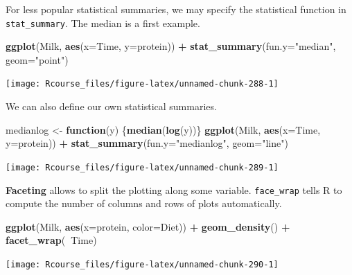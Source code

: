 \documentclass[]{book}
\newenvironment{Shaded}{\begin{snugshade}}{\end{snugshade}}
\newcommand{\ControlFlowTok}[1]{\textcolor[rgb]{0.13,0.29,0.53}{\textbf{#1}}}
\newcommand{\DataTypeTok}[1]{\textcolor[rgb]{0.13,0.29,0.53}{#1}}
\newcommand{\KeywordTok}[1]{\textcolor[rgb]{0.13,0.29,0.53}{\textbf{#1}}}
\newcommand{\NormalTok}[1]{#1}
\newcommand{\OperatorTok}[1]{\textcolor[rgb]{0.81,0.36,0.00}{\textbf{#1}}}
\newcommand{\StringTok}[1]{\textcolor[rgb]{0.31,0.60,0.02}{#1}}
\theoremstyle{definition}
\theoremstyle{definition}
\theoremstyle{definition}
\theoremstyle{remark}
\begin{document}
For less popular statistical summaries, we may specify the statistical function in \texttt{stat\_summary}. The median is a first example.

\begin{Shaded}
\begin{Highlighting}[]
\KeywordTok{ggplot}\NormalTok{(Milk, }\KeywordTok{aes}\NormalTok{(}\DataTypeTok{x=}\NormalTok{Time, }\DataTypeTok{y=}\NormalTok{protein)) }\OperatorTok{+}
\StringTok{  }\KeywordTok{stat_summary}\NormalTok{(}\DataTypeTok{fun.y=}\StringTok{"median"}\NormalTok{, }\DataTypeTok{geom=}\StringTok{"point"}\NormalTok{)}
\end{Highlighting}
\end{Shaded}

\texttt{[image: Rcourse\_files/figure-latex/unnamed-chunk-288-1]}

We can also define our own statistical summaries.

\begin{Shaded}
\begin{Highlighting}[]
\NormalTok{medianlog <-}\StringTok{ }\ControlFlowTok{function}\NormalTok{(y) \{}\KeywordTok{median}\NormalTok{(}\KeywordTok{log}\NormalTok{(y))\}}
\KeywordTok{ggplot}\NormalTok{(Milk, }\KeywordTok{aes}\NormalTok{(}\DataTypeTok{x=}\NormalTok{Time, }\DataTypeTok{y=}\NormalTok{protein)) }\OperatorTok{+}
\StringTok{  }\KeywordTok{stat_summary}\NormalTok{(}\DataTypeTok{fun.y=}\StringTok{"medianlog"}\NormalTok{, }\DataTypeTok{geom=}\StringTok{"line"}\NormalTok{)}
\end{Highlighting}
\end{Shaded}

\texttt{[image: Rcourse\_files/figure-latex/unnamed-chunk-289-1]}

\textbf{Faceting} allows to split the plotting along some variable.
\texttt{face\_wrap} tells R to compute the number of columns and rows of plots automatically.

\begin{Shaded}
\begin{Highlighting}[]
\KeywordTok{ggplot}\NormalTok{(Milk, }\KeywordTok{aes}\NormalTok{(}\DataTypeTok{x=}\NormalTok{protein, }\DataTypeTok{color=}\NormalTok{Diet)) }\OperatorTok{+}
\StringTok{  }\KeywordTok{geom_density}\NormalTok{() }\OperatorTok{+}
\StringTok{  }\KeywordTok{facet_wrap}\NormalTok{(}\OperatorTok{~}\NormalTok{Time)}
\end{Highlighting}
\end{Shaded}

\texttt{[image: Rcourse\_files/figure-latex/unnamed-chunk-290-1]}
\end{document}
